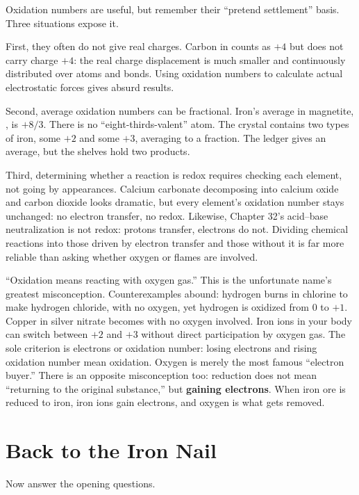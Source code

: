 Oxidation numbers are useful, but remember their ``pretend settlement'' basis. Three situations expose it.

First, they often do not give real charges. Carbon in  counts as $+4$ but does not carry charge $+4$: the real charge displacement is much smaller and continuously distributed over atoms and bonds. Using oxidation numbers to calculate actual electrostatic forces gives absurd results.

Second, average oxidation numbers can be fractional. Iron's average in magnetite, , is $+8/3$. There is no ``eight-thirds-valent'' atom. The crystal contains two types of iron, some $+2$ and some $+3$, averaging to a fraction. The ledger gives an average, but the shelves hold two products.

Third, determining whether a reaction is redox requires checking each element, not going by appearances. Calcium carbonate decomposing into calcium oxide and carbon dioxide looks dramatic, but every element's oxidation number stays unchanged: no electron transfer, no redox. Likewise, Chapter 32's acid--base neutralization is not redox: protons transfer, electrons do not. Dividing chemical reactions into those driven by electron transfer and those without it is far more reliable than asking whether oxygen or flames are involved.

\begin{wuqu}
``Oxidation means reacting with oxygen gas.'' This is the unfortunate name's greatest misconception. Counterexamples abound: hydrogen burns in chlorine to make hydrogen chloride, with no oxygen, yet hydrogen is oxidized from 0 to $+1$. Copper in silver nitrate becomes  with no oxygen involved. Iron ions in your body can switch between $+2$ and $+3$ without direct participation by oxygen gas. The sole criterion is electrons or oxidation number: losing electrons and rising oxidation number mean oxidation. Oxygen is merely the most famous ``electron buyer.'' There is an opposite misconception too: reduction does not mean ``returning to the original substance,'' but \textbf{gaining electrons}. When iron ore is reduced to iron, iron ions gain electrons, and oxygen is what gets removed.
\end{wuqu}

\section{Back to the Iron Nail}

Now answer the opening questions.

